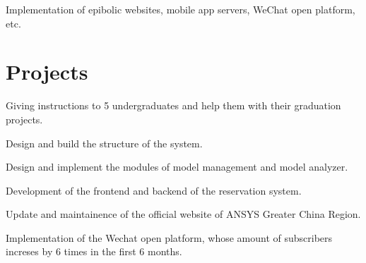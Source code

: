 \documentclass[a4paper]{resume-en}
\begin{document}
\begin{minipage}[t]{0.72\textwidth}
\sectionspace


\begin{tightitemize}
\item Implementation of epibolic websites, mobile app servers, WeChat open platform, etc.
\end{tightitemize}

\sectionspace


\section{Projects}

\begin{tightitemize}
\item Giving instructions to 5 undergraduates and help them with their graduation projects.
\item Design and build the structure of the system.
\item Design and implement the modules of model management and model analyzer.
\end{tightitemize}

\sectionspace


\begin{tightitemize}
\item Development of the frontend and backend of the reservation system.
\end{tightitemize}

\sectionspace


\begin{tightitemize}
\item Update and maintainence of the official website of ANSYS Greater China Region.
\item Implementation of the Wechat open platform, whose amount of subscribers increses by 6 times in the first 6 months.
\end{tightitemize}


\end{minipage}
\end{document}
